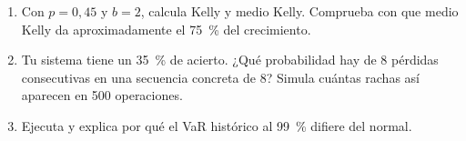 \begin{ejercicios}
\begin{enumerate}
\item Con $p=0{,}45$ y $b=2$, calcula Kelly y medio Kelly. Comprueba con  que medio Kelly da aproximadamente el 75~\% del crecimiento.
\item Tu sistema tiene un 35~\% de acierto. ¿Qué probabilidad hay de 8 pérdidas consecutivas en una secuencia concreta de 8? Simula cuántas rachas así aparecen en 500 operaciones.
\item Ejecuta  y explica por qué el VaR histórico al 99~\% difiere del normal.
\end{enumerate}
\end{ejercicios}
